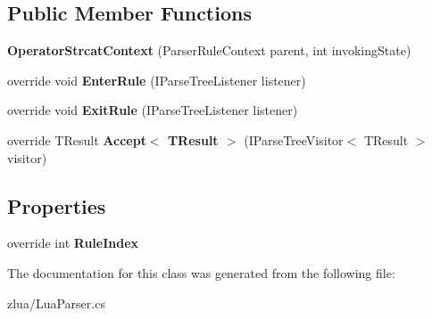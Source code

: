 \subsection*{Public Member Functions}
\begin{DoxyCompactItemize}
\item 
\mbox{\label{classzlua_1_1_lua_parser_1_1_operator_strcat_context_a194fe7a0d2fc2d342381f45aa78789e5}} 
{\bfseries Operator\+Strcat\+Context} (Parser\+Rule\+Context parent, int invoking\+State)
\item 
\mbox{\label{classzlua_1_1_lua_parser_1_1_operator_strcat_context_a9ab85f74bf769cb01b9e2a07946f8c55}} 
override void {\bfseries Enter\+Rule} (I\+Parse\+Tree\+Listener listener)
\item 
\mbox{\label{classzlua_1_1_lua_parser_1_1_operator_strcat_context_aa7fa67f17667514f5b7b80dcfe02909f}} 
override void {\bfseries Exit\+Rule} (I\+Parse\+Tree\+Listener listener)
\item 
\mbox{\label{classzlua_1_1_lua_parser_1_1_operator_strcat_context_a163a3f2aa9b41c52ab25b11a13bdbfe4}} 
override T\+Result {\bfseries Accept$<$ T\+Result $>$} (I\+Parse\+Tree\+Visitor$<$ T\+Result $>$ visitor)
\end{DoxyCompactItemize}
\subsection*{Properties}
\begin{DoxyCompactItemize}
\item 
\mbox{\label{classzlua_1_1_lua_parser_1_1_operator_strcat_context_a8388aa439c23712329f82584efa25f3c}} 
override int {\bfseries Rule\+Index}
\end{DoxyCompactItemize}


The documentation for this class was generated from the following file\+:\begin{DoxyCompactItemize}
\item 
zlua/Lua\+Parser.\+cs\end{DoxyCompactItemize}
